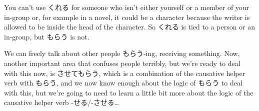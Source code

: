 You can't use くれる for someone who isn't either yourself or a member of your in-group or, for example in a novel, it could be a character because the writer is allowed to be inside the head of the character. So くれる is tied to a person or an in-group, but もらう is not.

We can freely talk about other people もらう-ing, receiving something. Now, another important area that confuses people terribly, but we're ready to deal with this now, is させてもらう, which is a combination of the causative helper verb with もらう, and we now know enough about the logic of もらう to deal with this, but we're going to need to learn a little bit more about the logic of the causative helper verb -せる/-させる\ldots{}

\stopsectionlevel

\stopsectionlevel

